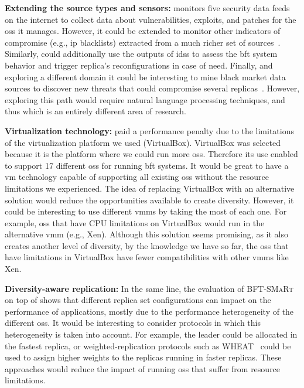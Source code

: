 \textbf{Extending the \system source types and sensors:}
\system monitors five security data feeds on the internet to collect data about vulnerabilities, exploits, and patches for the \glspl{os} it manages.
However, it could be extended to monitor other indicators of compromise (e.g., \gls{ip} blacklists) extracted from a much richer set of sources~\cite{Liao:2016,Sabottke:2015}.
Similarly, \system could additionally use the outputs of \glspl{ids} to assess the \gls{bft} system behavior and trigger replica's reconfigurations in case of need.
Finally, and exploring a different domain it could be interesting to mine black market data sources to discover new threats that could compromise several replicas~\cite{Allodi:2014}.
However, exploring this path would require natural language processing techniques, and thus which is an entirely different area of research.

\textbf{Virtualization technology:}
\system paid a performance penalty due to the limitations of the virtualization platform we used (VirtualBox).
VirtualBox was selected because it is the platform where we could run more \glspl{os}.
Therefore its use enabled \system to support 17 different \glspl{os} for running \gls{bft} systems.
It would be great to have a \gls{vm} technology capable of supporting all existing \glspl{os} without the resource limitations we experienced.
The idea of replacing VirtualBox with an alternative solution would reduce the opportunities available to create diversity.
However, it could be interesting to use different \glspl{vmm} by taking the most of each one. 
For example, \glspl{os} that have CPU limitations on VirtualBox would run in the alternative \gls{vmm} (e.g., Xen).
Although this solution seems promising, as it also creates another level of diversity, by the knowledge we have so far, the \glspl{os} that have limitations in VirtualBox have fewer compatibilities with other \glspl{vmm} like Xen.

\textbf{Diversity-aware replication:}
In the same line, the evaluation of \textsc{BFT-SMaRt} on top of \system shows that different replica set configurations can impact on the performance of applications, mostly due to the performance heterogeneity of the different \glspl{os}.
It would be interesting to consider protocols in which this heterogeneity is taken into account.
For example, the leader could be allocated in the fastest replica, or weighted-replication protocols such as WHEAT~\cite{Sousa:2015} could be used to assign higher weights to the replicas running in faster replicas.
These approaches would reduce the impact of running \glspl{os} that suffer from resource limitations.


